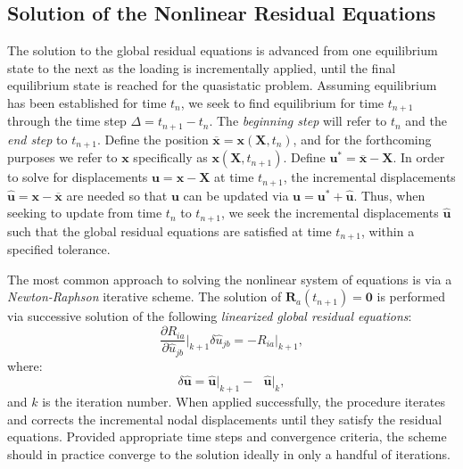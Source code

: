 \subsection{Solution of the Nonlinear Residual Equations}

The solution to the global residual equations is advanced from one equilibrium state to the next as the loading is incrementally applied, until the final equilibrium state is reached for the quasistatic problem. Assuming equilibrium has been established for time $t_n$, we seek to find equilibrium for time $t_{n+1}$ through the time step $\Delta = t_{n+1} - t_{n}$. The \textit{beginning step} will refer to $t_n$ and the \textit{end step} to $t_{n+1}$. Define the position $\overline{\bm{x}} = \bm{x}(\bm{X},t_n)$, and for the forthcoming purposes we refer to ${\bm{x}}$ specifically as $\bm{x}(\bm{X},t_{n+1})$. Define ${\bm{u}}^* = \overline{\bm{x}} - \bm{X}$. In order to solve for displacements $\bm{u} = \bm{x} - \bm{X}$ at time $t_{n+1}$, the incremental displacements $\hat{\bm{u}} = \bm{x} - \overline{\bm{x}}$ are needed so that $\bm{u}$ can be updated via $\bm{u} = {\bm{u}}^* + \hat{\bm{u}}$. Thus, when seeking to update from time $t_n$ to $t_{n+1}$, we seek the incremental displacements $\hat{\bm{u}}$ such that the global residual equations are satisfied at time $t_{n+1}$, within a specified tolerance.

The most common approach to solving the nonlinear system of equations is via a \textit{Newton-Raphson} iterative scheme. The solution of $\bm{R}_a(t_{n+1}) = \bm{0}$ is performed via successive solution of the following \textit{linearized global residual equations}:
\begin{equation}
\frac{\partial R_{ia}}{\partial \hat{u}_{jb}} \bigg|_{k+1} \delta\hat{u}_{jb} = -R_{ia}\bigg|_{k+1},
\label{eqn:newtonraphson}
\end{equation}
where:
\begin{equation}
\delta\hat{\bm{u}} = \hat{\bm{u}}\big|_{k+1} - \text{\ }\hat{\bm{u}}\big|_k,
\end{equation}
and $k$ is the iteration number. When applied successfully, the procedure iterates and corrects the incremental nodal displacements until they satisfy the residual equations. Provided appropriate time steps and convergence criteria, the scheme should in practice converge to the solution ideally in only a handful of iterations.

